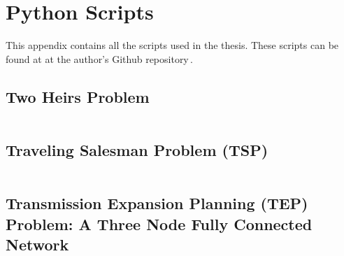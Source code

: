 
\chapter{Python Scripts} %

This appendix contains all the scripts used in the thesis. These scripts can be found at at the author's Github repository\,\cite{LopezBanos2023}.
\label{AppendixD} %
\section{Two Heirs Problem}
\inputminted[linenos]{python}{_scripts/Two_Heirs.py}
\section{Traveling Salesman Problem (TSP)}
\inputminted[linenos]{python}{_scripts/tsp_simulated_annealing.py}
\section{Transmission Expansion Planning (TEP) Problem: A Three Node Fully Connected Network}
\inputminted[linenos]{python}{_scripts/SingleDemand_ThreeNode_CQM.py}

